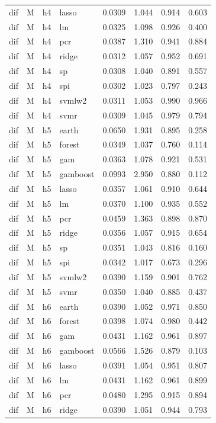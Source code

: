 \begin{ThreePartTable}
\begin{longtable}[t]{llclcccc}
dif & M & h4 & lasso & 0.0309 & 1.044 & 0.914 & 0.603\\
dif & M & h4 & lm & 0.0325 & 1.098 & 0.926 & 0.400\\
dif & M & h4 & pcr & 0.0387 & 1.310 & 0.941 & 0.884\\
dif & M & h4 & ridge & 0.0312 & 1.057 & 0.952 & 0.691\\
dif & M & h4 & sp & 0.0308 & 1.040 & 0.891 & 0.557\\
dif & M & h4 & spi & 0.0302 & 1.023 & 0.797 & 0.243\\
dif & M & h4 & svmlw2 & 0.0311 & 1.053 & 0.990 & 0.966\\
dif & M & h4 & svmr & 0.0309 & 1.045 & 0.979 & 0.794\\
\addlinespace
dif & M & h5 & earth & 0.0650 & 1.931 & 0.895 & 0.258\\
dif & M & h5 & forest & 0.0349 & 1.037 & 0.760 & 0.114\\
dif & M & h5 & gam & 0.0363 & 1.078 & 0.921 & 0.531\\
dif & M & h5 & gamboost & 0.0993 & 2.950 & 0.880 & 0.112\\
dif & M & h5 & lasso & 0.0357 & 1.061 & 0.910 & 0.644\\
dif & M & h5 & lm & 0.0370 & 1.100 & 0.935 & 0.552\\
dif & M & h5 & pcr & 0.0459 & 1.363 & 0.898 & 0.870\\
dif & M & h5 & ridge & 0.0356 & 1.057 & 0.915 & 0.654\\
dif & M & h5 & sp & 0.0351 & 1.043 & 0.816 & 0.160\\
dif & M & h5 & spi & 0.0342 & 1.017 & 0.673 & 0.296\\
dif & M & h5 & svmlw2 & 0.0390 & 1.159 & 0.901 & 0.762\\
dif & M & h5 & svmr & 0.0350 & 1.040 & 0.885 & 0.437\\
\addlinespace
dif & M & h6 & earth & 0.0390 & 1.052 & 0.971 & 0.850\\
dif & M & h6 & forest & 0.0398 & 1.074 & 0.980 & 0.442\\
dif & M & h6 & gam & 0.0431 & 1.162 & 0.961 & 0.897\\
dif & M & h6 & gamboost & 0.0566 & 1.526 & 0.879 & 0.103\\
dif & M & h6 & lasso & 0.0391 & 1.054 & 0.951 & 0.807\\
dif & M & h6 & lm & 0.0431 & 1.162 & 0.961 & 0.899\\
dif & M & h6 & pcr & 0.0480 & 1.295 & 0.915 & 0.894\\
dif & M & h6 & ridge & 0.0390 & 1.051 & 0.944 & 0.793\\

\end{longtable}
\end{ThreePartTable}
